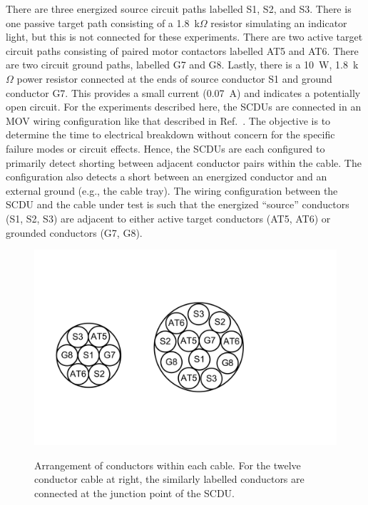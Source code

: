 There are three energized source circuit paths labelled S1, S2, and S3. There is one passive target path consisting of a 1.8~k$\Omega$ resistor simulating an indicator light, but this is not connected for these experiments. There are two active target circuit paths consisting of paired motor contactors labelled AT5 and AT6. There are two circuit ground paths, labelled G7 and G8. Lastly, there is a 10~W, 1.8~k$\Omega$ power resistor connected at the ends of source conductor S1 and ground conductor G7. This provides a small current (0.07~A) and indicates a potentially open circuit. For the experiments described here, the SCDUs are connected in an MOV wiring configuration like that described in Ref.~\cite{CAROLFIRE}.  The objective is to determine the time to electrical breakdown without concern for the specific failure modes or circuit effects. Hence, the SCDUs are each configured to primarily detect shorting between adjacent conductor pairs within the cable.  The configuration also detects a short between an energized conductor and an external ground (e.g., the cable tray). The wiring configuration between the SCDU and the cable under test is such that the energized ``source'' conductors (S1, S2, S3) are adjacent to either active target conductors (AT5, AT6) or grounded conductors (G7, G8).

\begin{figure}[ht]
\centering
\vspace{-0.5in}
\includegraphics[width=5.5in]{../FIGURES/Cable_Cross_Section} \\
\vspace{-0.5in}
\caption[Diagram of cable conductors]{Arrangement of conductors within each cable. For the twelve conductor cable at right, the similarly labelled conductors are connected at the junction point of the SCDU.}
\label{cable_cross_section}
\end{figure}

